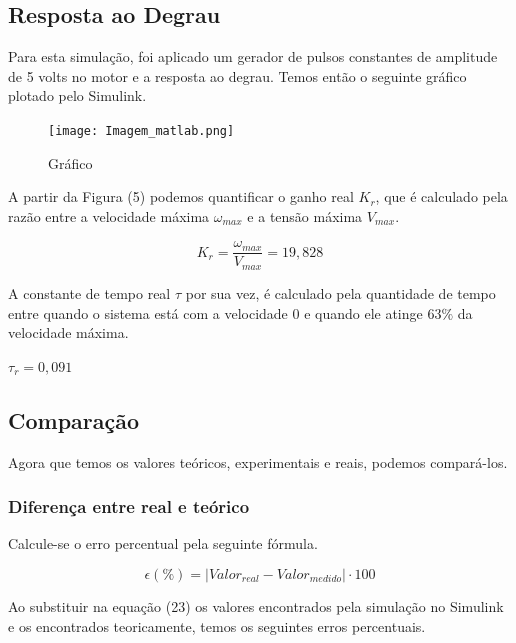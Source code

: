 \documentclass[12pt]{article}
\begin{document}
\subsection{Resposta ao Degrau}

\quad Para esta simulação, foi aplicado um gerador de pulsos constantes de amplitude de 5 volts no motor e a resposta ao degrau. Temos então o seguinte gráfico plotado pelo Simulink.

\begin{figure}[H] %
    \centering
    \texttt{[image: Imagem\_matlab.png]}
    \caption{Gráfico}
    \label{fig:mesh5}
\end{figure}

\quad A partir da Figura (5) podemos quantificar o ganho real $K_r$, que é calculado pela razão entre a velocidade máxima $\omega_{max}$ e a tensão máxima $V_{max}$. 

\begin{equation}
    K_r = \frac{\omega_{max}}{V_{max}} = 19,828
\end{equation}

\quad A constante de tempo real $\tau$ por sua vez, é calculado pela quantidade de tempo entre quando o sistema está com a velocidade 0 e quando ele atinge $63\%$ da velocidade máxima. 

\begin{center}
    $\tau_r = 0,091$
\end{center}

\subsection{Comparação}

\quad Agora que temos os valores teóricos, experimentais e reais, podemos compará-los.

\subsubsection{Diferença entre real e teórico}

\quad Calcule-se o erro percentual pela seguinte fórmula.

\begin{equation}
     \epsilon (\%) = |Valor_{real} - Valor_{medido}|\cdot 100
\end{equation}

\quad Ao substituir na equação (23) os valores encontrados pela simulação no Simulink e os encontrados teoricamente, temos os seguintes erros percentuais.
\end{document}
